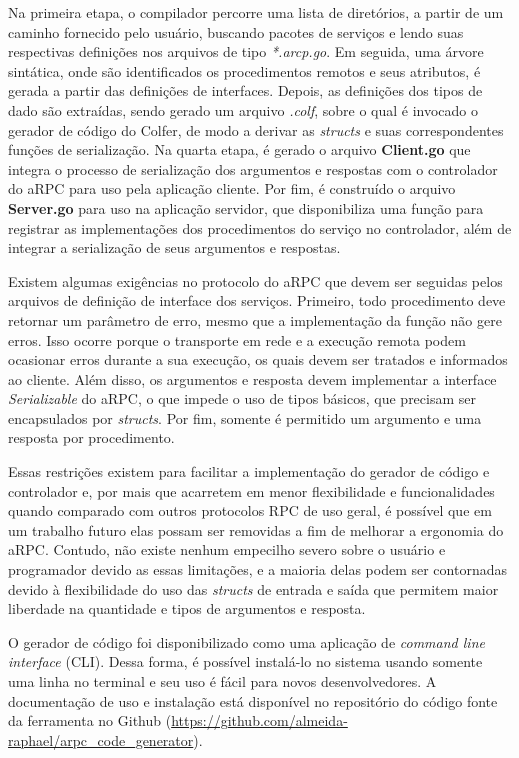 Na primeira etapa, o compilador percorre uma lista de diretórios, a partir de um caminho fornecido pelo usuário, buscando pacotes de serviços e lendo suas respectivas definições nos arquivos de tipo \textit{*.arcp.go}. Em seguida, uma árvore sintática, onde são identificados os procedimentos remotos e seus atributos, é gerada a partir das definições de interfaces. Depois, as definições dos tipos de dado são extraídas, sendo gerado um arquivo \textit{.colf}, sobre o qual é invocado o gerador de código do Colfer, de modo a derivar as \textit{structs} e suas correspondentes funções de serialização. Na quarta etapa, é gerado o arquivo \textbf{Client.go} que integra o processo de serialização dos argumentos e respostas com o controlador do aRPC para uso pela aplicação cliente. Por fim, é construído o arquivo \textbf{Server.go} para uso na aplicação servidor, que disponibiliza uma função para registrar as implementações dos procedimentos do serviço no controlador, além de integrar a serialização de seus argumentos e respostas.

Existem algumas exigências no protocolo do aRPC que devem ser seguidas pelos arquivos de definição de interface dos serviços. Primeiro, todo procedimento deve retornar um parâmetro de erro, mesmo que a implementação da função não gere erros. Isso ocorre porque o transporte em rede e a execução remota podem ocasionar erros durante a sua execução, os quais devem ser tratados e informados ao cliente. Além disso, os argumentos e resposta devem implementar a interface \textit{Serializable} do aRPC, o que impede o uso de tipos básicos, que precisam ser encapsulados por \textit{structs}. Por fim, somente é permitido um argumento e uma resposta por procedimento. 

Essas restrições existem para facilitar a implementação do gerador de código e controlador e, por mais que acarretem em menor flexibilidade e funcionalidades quando comparado com outros protocolos RPC de uso geral, é possível que em um trabalho futuro elas possam ser removidas a fim de melhorar a ergonomia do aRPC. Contudo, não existe nenhum empecilho severo sobre o usuário e programador devido as essas limitações, e a maioria delas podem ser contornadas devido à flexibilidade do uso das \textit{structs} de entrada e saída que permitem maior liberdade na quantidade e tipos de argumentos e resposta.

O gerador de código foi disponibilizado como uma aplicação de \textit{command line interface} (CLI). Dessa forma, é possível instalá-lo no sistema usando somente uma linha no terminal e seu uso é fácil para novos desenvolvedores. A documentação de uso e instalação está disponível no repositório do código fonte da ferramenta no Github (\url{https://github.com/almeida-raphael/arpc\_code\_generator}).

